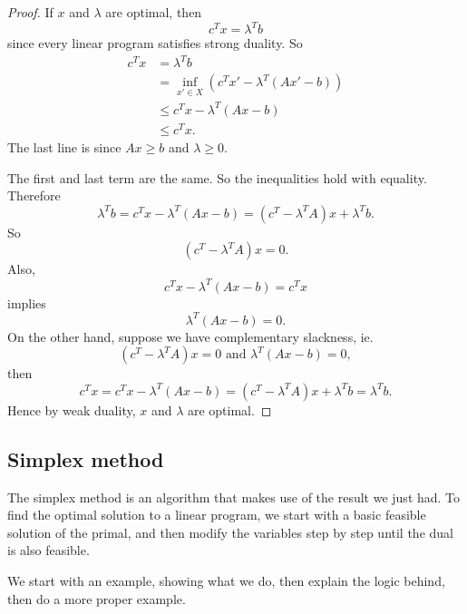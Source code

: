 \documentclass[a4paper]{article}
\begin{document}
\begin{proof}
  If $x$ and $\lambda$ are optimal, then
  \[
    c^Tx = \lambda^T b
  \]
  since every linear program satisfies strong duality. So
  \begin{align*}
    c^Tx &= \lambda^T b\\
    &= \inf_{x'\in X} (c^T x' - \lambda^T(Ax' - b))\\
    &\leq c^T x - \lambda^T (Ax - b)\\
    &\leq c^T x.
  \end{align*}
  The last line is since $Ax \geq b$ and $\lambda\geq 0$.

  The first and last term are the same. So the inequalities hold with equality. Therefore
  \[
    \lambda^T b = c^Tx - \lambda^T (Ax - b) = (c^T - \lambda^TA)x + \lambda^Tb.
  \]
  So
  \[
    (c^T - \lambda^TA)x = 0.
  \]
  Also,
  \[
    c^Tx - \lambda^T(Ax - b) = c^Tx
  \]
  implies
  \[
    \lambda^T(Ax - b) = 0.
  \]
  On the other hand, suppose we have complementary slackness, ie.
  \[
    (c^T - \lambda^T A)x = 0\text{ and }\lambda^T(Ax - b) = 0,
  \]
  then
  \[
    c^Tx = c^Tx - \lambda^T(Ax - b) = (c^T - \lambda^T A)x + \lambda^T b = \lambda^Tb.
  \]
  Hence by weak duality, $x$ and $\lambda$ are optimal.
\end{proof}
\subsection{Simplex method}
The simplex method is an algorithm that makes use of the result we just had. To find the optimal solution to a linear program, we start with a basic feasible solution of the primal, and then modify the variables step by step until the dual is also feasible.

We start with an example, showing what we do, then explain the logic behind, then do a more proper example.
\end{document}
